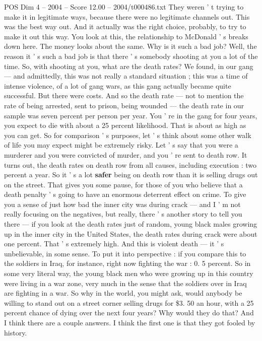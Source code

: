 \begin{textsample}{POS Dim 4 – 2004 – Score 12.00 – 2004/t000486.txt}
They weren ' t trying to make it in legitimate ways, because there were no legitimate channels out.
This was the best way out.
And it actually was the right choice, probably, to try to make it out this way.
You look at this, the relationship to McDonald ' s breaks down here.
The money looks about the same.
Why is it such a bad job?
Well, the reason it ' s such a bad job is that there ' s somebody shooting at you a lot of the time.
So, with shooting at you, what are the death rates?
We found, in our gang — and admittedly, this was not really a standard situation ; this was a time of intense violence, of a lot of gang wars, as this gang actually became quite successful.
But there were costs.
And so the death rate — not to mention the rate of being arrested, sent to prison, being wounded — the death rate in our sample was seven percent per person per year.
You ' re in the gang for four years, you expect to die with about a 25 percent likelihood.
That is about as high as you can get.
So for comparison ' s purposes, let ' s think about some other walk of life you may expect might be extremely risky.
Let ' s say that you were a murderer and you were convicted of murder, and you ' re sent to death row.
It turns out, the death rates on death row from all causes, including execution : two percent a year.
So it ' s a lot \textbf{safer} being on death row than it is selling drugs out on the street.
That gives you some pause, for those of you who believe that a death penalty ' s going to have an enormous deterrent effect on crime.
To give you a sense of just how bad the inner city was during crack — and I ' m not really focusing on the negatives, but really, there ' s another story to tell you there — if you look at the death rates just of random, young black males growing up in the inner city in the United States, the death rates during crack were about one percent.
That ' s extremely high.
And this is violent death — it ' s unbelievable, in some sense.
To put it into perspective : if you compare this to the soldiers in Iraq, for instance, right now fighting the war : 0. 5 percent.
So in some very literal way, the young black men who were growing up in this country were living in a war zone, very much in the sense that the soldiers over in Iraq are fighting in a war.
So why in the world, you might ask, would anybody be willing to stand out on a street corner selling drugs for \$3. 50 an hour, with a 25 percent chance of dying over the next four years?
Why would they do that?
And I think there are a couple answers.
I think the first one is that they got fooled by history.

\end{textsample}
